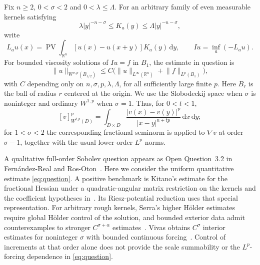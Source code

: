 \documentclass[11pt]{article}
\newcommand{\R}{\mathbb R}
\newcommand{\dd}{\,\mathrm d}
\newcommand{\norm}[1]{\lVert#1\rVert}
\DeclareMathOperator{\PV}{PV}
\theoremstyle{remark}
\numberwithin{equation}{section}
\begin{document}
Fix $n\ge2$, $0<\sigma<2$ and $0<\lambda\le\Lambda$. For an arbitrary
family of even measurable kernels satisfying
\begin{equation}\label{eq:originalclass}
 \lambda |y|^{-n-\sigma}\le K_a(y)\le\Lambda |y|^{-n-\sigma},
\end{equation}
write
\begin{equation}\label{eq:originaloperator}
 L_a u(x)=\PV\int_{\R^n}[u(x)-u(x+y)]K_a(y)\dd y,
 \qquad Iu=\inf_a(-L_a u).
\end{equation}
For bounded viscosity solutions of $Iu=f$ in $B_1$, the estimate in
question is
\begin{equation}\label{eq:question}
 \norm u_{W^{\sigma,p}(B_{1/2})}
 \le C\bigl(\norm u_{L^\infty(\R^n)}+\norm f_{L^p(B_1)}\bigr),
\end{equation}
with $C$ depending only on $n,\sigma,p,\lambda,\Lambda$, for all
sufficiently large finite $p$. Here $B_r$ is the ball of radius $r$
centered at the origin. We use the Slobodeckij space when $\sigma$ is
noninteger and ordinary $W^{1,p}$ when $\sigma=1$.
Thus, for $0<t<1$,
\[
 [v]_{W^{t,p}(D)}^p=\int_{D\times D}
             \frac{|v(x)-v(y)|^p}{|x-y|^{n+tp}}\dd x\dd y;
\]
for $1<\sigma<2$ the corresponding fractional seminorm is applied to
$\nabla v$ at order $\sigma-1$, together with the usual lower-order
$L^p$ norms.

A qualitative full-order Sobolev question appears as Open Question~3.2 in
Fern\'andez-Real and Ros-Oton~\cite[Section 3.6.2]{Book}.
Here we consider the uniform quantitative estimate \eqref{eq:question}.
A positive benchmark is Kitano's estimate for the fractional Hessian
under a quadratic-angular matrix restriction on the kernels and the
coefficient hypotheses in~\cite[Theorem 4.1]{Kitano}. Its Riesz-potential reduction uses that
special representation. For arbitrary rough kernels, Serra's higher
H\"older estimates require global H\"older control of the solution,
and bounded exterior data admit counterexamples to stronger
$C^{\sigma+\alpha}$ estimates~\cite{Serra}. Vivas obtains $C^\sigma$
interior estimates for noninteger $\sigma$ with bounded continuous
forcing~\cite{Vivas}. Control of increments at that order alone does
not provide the scale summability or the $L^p$-forcing dependence in
\eqref{eq:question}.
\end{document}
